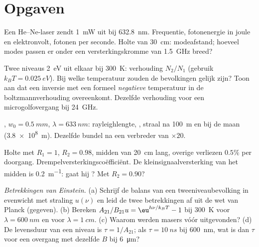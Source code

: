 \section{Opgaven}

\begin{exercise}[$\star$]\label{exo:b2:laser:1}
Een He--Ne-laser zendt \qty{1}{mW} uit bij \qty{632.8}{nm}. Frequentie,
foton\-energie
in joule en elektronvolt, fotonen per seconde. Holte van
\qty{30}{cm}: modeafstand; hoeveel modes passen er onder een versterkingskromme
van \qty{1.5}{GHz} breed?
\end{exercise}

\begin{exercise}[$\star$]\label{exo:b2:laser:2}
Twee niveaus \qty{2}{eV} uit elkaar bij \qty{300}{K}: verhouding $N_2/N_1$ (gebruik
$k_BT = \qty{0.025}{eV}$). Bij welke temperatuur zouden de bevolkingen
gelijk zijn? Toon aan dat een inversie met een formeel \emph{negatieve}
temperatuur in de boltzmannverhouding overeenkomt. Dezelfde verhouding voor
een microgolfovergang
bij \qty{24}{GHz}.
\end{exercise}

\begin{exercise}[$\star$]\label{exo:b2:laser:3}
, $w_0 = \qty{0.5}{mm}$, $\lambda = \qty{633}{nm}$:
rayleigh\-lengte,
, straal na \qty{100}{m} en bij de maan
(\qty{3.8e8}{m}). Dezelfde bundel na een verbreder van $\times 20$.
\end{exercise}

\begin{exercise}[$\star$]\label{exo:b2:laser:4}
Holte met $R_1 = 1$, $R_2 = 0.98$, midden van \qty{20}{cm} lang, overige
verliezen $0.5\%$ per doorgang. Drempelversterkingscoëfficiënt. De
kleinsignaalversterking
van het midden is \qty{0.2}{m^{-1}}: gaat hij ? Met
$R_2 = 0.90$?
\end{exercise}

\begin{exercise}[$\star\star$]\label{exo:b2:laser:5}
\emph{Betrekkingen van Einstein.} (a) Schrijf de balans van een tweeniveaubevolking
in evenwicht met straling $u(\nu)$ en leid de twee
betrekkingen af uit de wet van Planck (gegeven). (b) Bereken
$A_{21}/B_{21}u = \eu^{h\nu/k_BT} - 1$ bij \qty{300}{K} voor
$\lambda = \qty{600}{nm}$ en voor $\lambda = \qty{1}{cm}$. (c) Waarom werden
masers vóór  uitgevonden? (d) De levensduur van een niveau is
$\tau = 1/A_{21}$; als $\tau = \qty{10}{ns}$ bij \qty{600}{nm}, wat is dan
$\tau$ voor een overgang met dezelfde $B$ bij \qty{6}{\micro m}?
\end{exercise}

